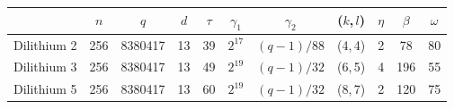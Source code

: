 \begin{tabular}{|c|c|c|c|c|c|c|c|c|c|c|}
  \hline
              & $n$ & $q$     & $d$ & $\tau$ & $\gamma_1$ & $\gamma_2$ & ($k$,\,$l$) & $\eta$ & $\beta$ & $\omega$ \\
  \hline
  Dilithium 2 & 256 & 8380417 & 13  & 39     & $2^{17}$   & $(q-1)/88$ & (4,\,4)     & 2      & 78      & 80       \\
  Dilithium 3 & 256 & 8380417 & 13  & 49     & $2^{19}$   & $(q-1)/32$ & (6,\,5)     & 4      & 196     & 55       \\
  Dilithium 5 & 256 & 8380417 & 13  & 60     & $2^{19}$   & $(q-1)/32$ & (8,\,7)     & 2      & 120     & 75       \\
  \hline
\end{tabular}
